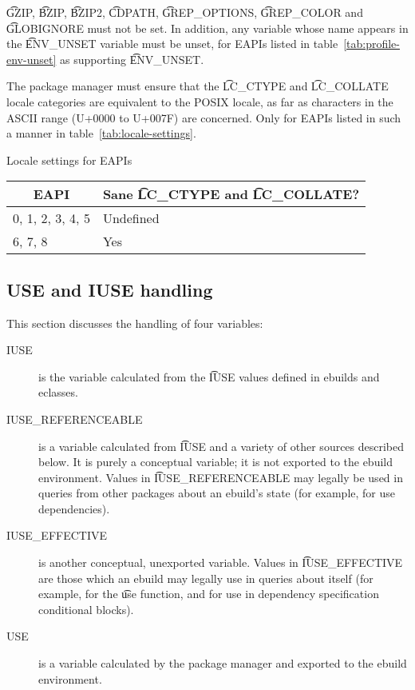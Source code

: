 \t{GZIP}, \t{BZIP}, \t{BZIP2}, \t{CDPATH}, \t{GREP_OPTIONS}, \t{GREP_COLOR} and \t{GLOBIGNORE}
must not be set.
 In addition, any variable whose name appears in the \t{ENV_UNSET} variable
must be unset, for EAPIs listed in table~\ref{tab:profile-env-unset} as supporting \t{ENV_UNSET}.

 The package manager must ensure that the \t{LC_CTYPE} and
\t{LC_COLLATE} locale categories are equivalent to the POSIX locale, as far as characters in the
ASCII range (U+0000 to U+007F) are concerned. Only for EAPIs listed in such a manner in
table~\ref{tab:locale-settings}.

\begin{centertable}{Locale settings for EAPIs}
    \label{tab:locale-settings}
    \begin{tabular}{ll}
      \toprule
      \multicolumn{1}{c}{\textbf{EAPI}} &
      \multicolumn{1}{c}{\textbf{Sane \t{LC_CTYPE} and \t{LC_COLLATE}?}} \\
      \midrule
      0, 1, 2, 3, 4, 5  & Undefined \\
      6, 7, 8           & Yes       \\
      \bottomrule
    \end{tabular}
\end{centertable}

\subsection{USE and IUSE handling}
\label{sec:use-iuse-handling}

This section discusses the handling of four variables:
\nobreakpar
\begin{description}
\item[IUSE] is the variable calculated from the \t{IUSE} values defined in ebuilds and eclasses.
\item[IUSE_REFERENCEABLE] is a variable calculated from \t{IUSE} and a variety of other sources
    described below. It is purely a conceptual variable; it is not exported to the ebuild
    environment. Values in \t{IUSE_REFERENCEABLE} may legally be used in queries from other
    packages about an ebuild's state (for example, for use dependencies).
\item[IUSE_EFFECTIVE] is another conceptual, unexported variable. Values in \t{IUSE_EFFECTIVE} are
    those which an ebuild may legally use in queries about itself (for example, for the \t{use}
    function, and for use in dependency specification conditional blocks).
\item[USE] is a variable calculated by the package manager and exported to the ebuild environment.
\end{description}

